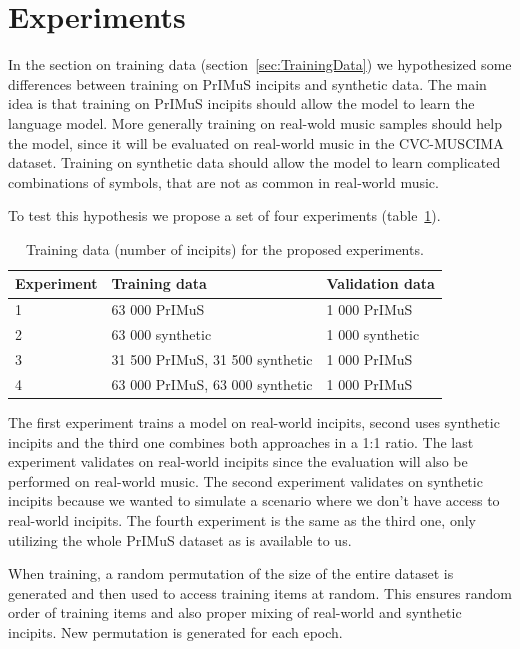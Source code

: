 \section{Experiments}

In the section on training data (section~\ref{sec:TrainingData}) we hypothesized some differences between training on PrIMuS incipits and synthetic data. The main idea is that training on PrIMuS incipits should allow the model to learn the language model. More generally training on real-wold music samples should help the model, since it will be evaluated on real-world music in the CVC-MUSCIMA dataset. Training on synthetic data should allow the model to learn complicated combinations of symbols, that are not as common in real-world music.

To test this hypothesis we propose a set of four experiments (table~\ref{tab6:ExperimentData}).

\begin{table}[h] \centering
\begin{tabular}{lll}
\toprule
\textbf{Experiment} & \textbf{Training data} & \textbf{Validation data} \\
\midrule
1 & 63 000 PrIMuS                   & 1 000 PrIMuS    \\
2 & 63 000 synthetic                & 1 000 synthetic \\
3 & 31 500 PrIMuS, 31 500 synthetic & 1 000 PrIMuS    \\
4 & 63 000 PrIMuS, 63 000 synthetic & 1 000 PrIMuS    \\
\bottomrule
\end{tabular}
\caption{Training data (number of incipits) for the proposed experiments.}
\label{tab6:ExperimentData}
\end{table}

The first experiment trains a model on real-world incipits, second uses synthetic incipits and the third one combines both approaches in a 1:1 ratio. The last experiment validates on real-world incipits since the evaluation will also be performed on real-world music. The second experiment validates on synthetic incipits because we wanted to simulate a scenario where we don't have access to real-world incipits. The fourth experiment is the same as the third one, only utilizing the whole PrIMuS dataset as is available to us.

When training, a random permutation of the size of the entire dataset is generated and then used to access training items at random. This ensures random order of training items and also proper mixing of real-world and synthetic incipits. New permutation is generated for each epoch.

